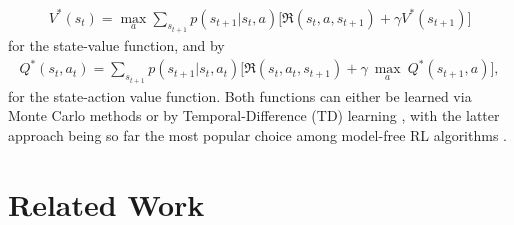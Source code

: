 \begin{align}
    V^{*}(s_t) = \underset{a}{\max}\sum_{s_{t+1}}p(s_{t+1} | s_{t}, a) \bigg[\Re (s_{t}, a, s_{t+1}) + \gamma V^{*}(s_{t+1}) \bigg]
\end{align}
for the state-value function, and by
\begin{multline}
    Q^{*}(s_t,a_t)=\sum_{s_{t+1}}p(s_{t+1} | s_{t}, a_{t})  \bigg[\Re (s_{t}, a_{t}, s_{t+1}) + \gamma \: \underset{a}{\max} \: Q^{*}(s_{t+1}, a) \bigg],
\end{multline}
for the state-action value function. Both functions can either be learned via Monte Carlo methods or by Temporal-Difference (TD) learning \cite{sutton1988learning}, with the latter approach being so far the most popular choice among model-free RL algorithms \cite{watkins1992q, rummery1994line, hasselt2010double}. %

\section{Related Work}
\label{sec:ijcnn_related_work}

